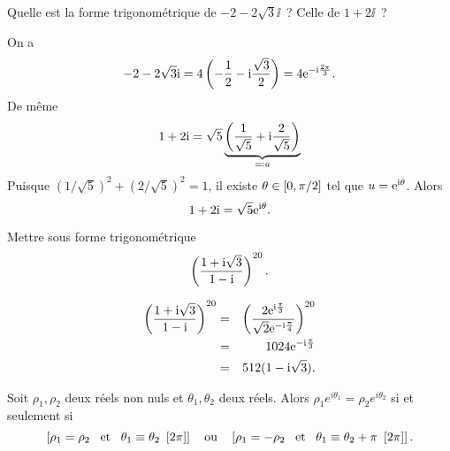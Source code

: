 \documentclass{magnolia}
\begin{document}
\begin{exos}
\exo Quelle est la forme trigonométrique de $-2-2\sqrt{3}\ii$~? Celle de $1+2\ii$~?
\begin{sol}
On a
\[-2-2\sqrt{3}{\rm i}=4\left(-\frac{1}{2}-{\rm i}\frac{\sqrt{3}}{2}\right)=4{\rm e}^{-{\rm i}\frac{2\pi}{3}}.\]
De même
\[1+2{\rm i}=\sqrt{5}\underbrace{\left(\frac{1}{\sqrt{5}}+{\rm i}\frac{2}{\sqrt{5}}\right)}_{\eqqcolon u}\]
Puisque $(1/\sqrt{5})^2+(2/\sqrt{5})^2=1$, il existe $\theta\in\left[0,\pi/2\right]$ tel que $u={\rm e}^{{\rm i}\theta}$. Alors
\[1+2{\rm i}=\sqrt{5}{\rm e}^{{\rm i}\theta}.\]
\end{sol}
\exo Mettre sous forme trigonométrique
  \[\left(\frac{1+{\rm i} \sqrt{3}}{1-{\rm i}}\right)^{20}.\]
\begin{sol}
\begin{eqnarray*}
\left(\frac{1+{\rm i} \sqrt{3}}{1-{\rm i}}\right)^{20}
&=& \left(\frac{2{\rm e}^{{\rm i}\frac{\pi}{3}}}{\sqrt{2}{\rm e}^{-{\rm i}\frac{\pi}{4}}}\right)^{20}\\
&=& 1024{\rm e}^{-{\rm i}\frac{\pi}{3}}\\
&=& 512(1-{\rm i}\sqrt{3}).
\end{eqnarray*}
\end{sol}
\end{exos}

\begin{proposition}[utile=-3]
Soit $\rho_1,\rho_2$ deux réels non nuls et $\theta_1,\theta_2$ deux réels.
Alors $\rho_1 e^{i\theta_1}=\rho_2 e^{i\theta_2}$ si et seulement si
\[\cro{\rho_1=\rho_2 \et \theta_1\equiv\theta_2\ \cro{2\pi}} \quad \text{ou}
  \quad \cro{\rho_1=-\rho_2 \et \theta_1\equiv\theta_2+\pi\ \cro{2\pi}}.\]
\end{proposition}
\end{document}
